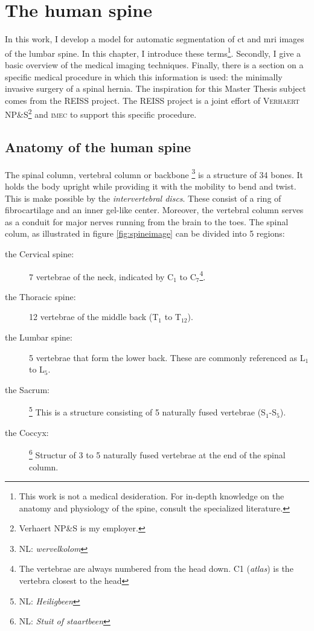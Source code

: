 \chapter{The human spine}

In this work, I develop a model for automatic segmentation of \acrfull{ct} and \acrfull{mri} images of the lumbar spine.
In this chapter, I introduce these terms\footnote{This work is not a medical desideration. For in-depth knowledge on the anatomy and physiology of the spine, consult the specialized literature.}.
Secondly, I give a basic overview of the medical imaging techniques. 
Finally, there is a section on a specific medical procedure in which this information is used: the minimally invasive surgery of a spinal hernia.
The inspiration for this Master Thesis subject comes from the REISS project.
The REISS project is a joint effort of \textsc{Verhaert NP\&S}\footnote{Verhaert NP\&S is my employer.} and \textsc{imec} to support this specific procedure. 

\section{Anatomy of the human spine}

The spinal column, vertebral column or backbone \footnote{NL: \textit{wervelkolom}} is a structure of 34 bones. 
It holds the body upright while providing it with the mobility to bend and twist.
This is make possible by the \textit{intervertebral discs}. These consist of a ring of fibrocartilage and an inner gel-like center.
Moreover, the vertebral column serves as a conduit for major nerves running from the brain to the toes.
The spinal colum, as illustrated in figure \ref{fig:spineimage} can be divided into 5 regions:
\begin{description}
    \item[the Cervical spine:] 7 vertebrae of the neck, indicated by C$_1$ to C$_7$\footnote{The vertebrae are always numbered from the head down. C1 (\textit{atlas}) is the vertebra closest to the head}.
    \item[the Thoracic spine:] 12 vertebrae of the middle back (T$_1$ to T$_{12}$).
    \item[the Lumbar spine:] 5 vertebrae that form the lower back. These are commonly referenced as L$_1$ to L$_5$.
    \item[the Sacrum:]\footnote{NL: \textit{Heiligbeen}} This is a structure consisting of 5 naturally fused vertebrae (S$_1$-S$_5$).
    \item[the Coccyx:]\footnote{NL: \textit{Stuit of staartbeen}} Structur of 3 to 5 naturally fused vertebrae at the end of the spinal column.
\end{description}


